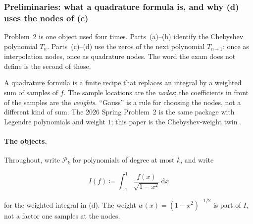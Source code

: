 \setcounter{section}{2}
\setcounter{theorem}{0}
\setcounter{definition}{0}
\setcounter{remark}{0}
\setcounter{note}{0}

\subsubsection{Preliminaries: what a quadrature formula is, and why (d) uses the nodes of (c)}

Problem~2 is one object used four times. Parts~(a)--(b) identify the Chebyshev polynomial \(T_{n}\). Parts~(c)--(d) use the zeros of the next polynomial \(T_{n+1}\): once as interpolation nodes, once as quadrature nodes. The word the exam does not define is the second of those.

A quadrature formula is a finite recipe that replaces an integral by a weighted sum of samples of \(f\). The sample locations are the \emph{nodes}; the coefficients in front of the samples are the \emph{weights}. ``Gauss'' is a rule for choosing the nodes, not a different kind of sum. The 2026 Spring Problem~2 is the same package with Legendre polynomials and weight \(1\); this paper is the Chebyshev-weight twin \cite{conte00}.

\begin{center}
\end{center}

\paragraph{The objects.}

Throughout, write \(\mathcal{P}_{k}\) for polynomials of degree at most \(k\), and write

\[
I(f)
\coloneqq
\int_{-1}^{1}
\frac{f(x)}{\sqrt{1-x^{2}}}\,
\mathrm{d}x
\]

for the weighted integral in (d). The weight \(w(x)=(1-x^{2})^{-1/2}\) is part of \(I\), not a factor one samples at the nodes.

